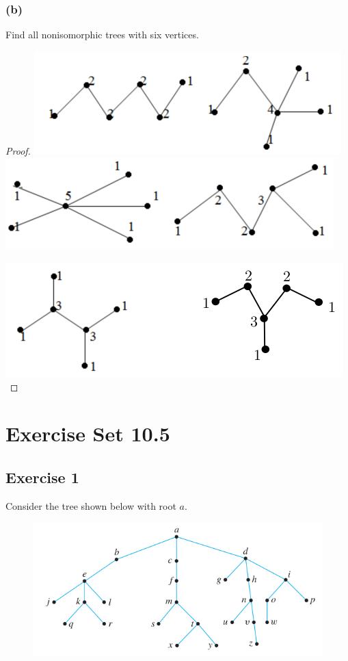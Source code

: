 \documentclass[14pt]{extarticle}
\begin{document}
\subsubsection{(b)}
Find all nonisomorphic trees with six vertices.
\begin{proof}
\includegraphics[scale=0.5]{../images/10.4.31.b.1.png}
\includegraphics[scale=0.5]{../images/10.4.31.b.2.png}

\hspace{3cm}\includegraphics[scale=0.5]{../images/10.4.31.b.3.png}
\end{proof}

\section{Exercise Set 10.5}
\subsection{Exercise 1}
Consider the tree shown below with root \(a\).

\begin{figure}[ht!]
\centering
\includegraphics[scale=0.5]{../images/10.5.1.png}
\end{figure}
\end{document}
